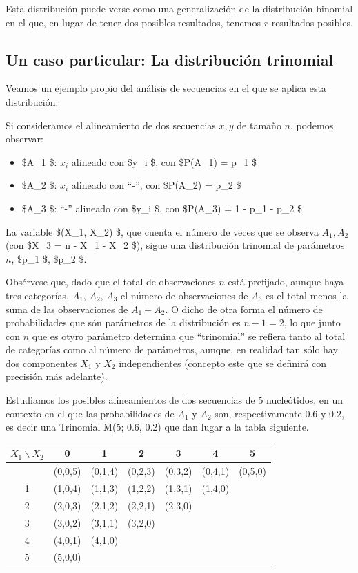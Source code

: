 \documentclass[
  a4paper,
  DIV=11,
  numbers=noendperiod]{scrreprt}
\providecommand{\tightlist}{%
  \setlength{\itemsep}{0pt}\setlength{\parskip}{0pt}}\usepackage{longtable,booktabs,array}
\begin{document}
Esta distribución puede verse como una generalización de la distribución
binomial en el que, en lugar de tener dos posibles resultados, tenemos
\(r\) resultados posibles.

\subsection{Un caso particular: La distribución
trinomial}\label{un-caso-particular-la-distribuciuxf3n-trinomial}

Veamos un ejemplo propio del análisis de secuencias en el que se aplica
esta distribución:

Si consideramos el alineamiento de dos secuencias \(x, y\) de tamaño
\(n\), podemos observar:

\begin{itemize}
\tightlist
\item
  \$A\_1 \$: \(x_i\) alineado con \$y\_i \$, con \$P(A\_1) = p\_1 \$
\item
  \$A\_2 \$: \(x_i\) alineado con ``-'', con \$P(A\_2) = p\_2 \$
\item
  \$A\_3 \$: ``-'' alineado con \$y\_i \$, con \$P(A\_3) = 1 - p\_1 -
  p\_2 \$
\end{itemize}

La variable \$(X\_1, X\_2) \$, que cuenta el número de veces que se
observa \(A_1, A_2\) (con \$X\_3 = n - X\_1 - X\_2 \$), sigue una
distribución trinomial de parámetros \(n\), \$p\_1 \$, \$p\_2 \$.

Obsérvese que, dado que el total de observaciones \(n\) está prefijado,
aunque haya tres categorías, \(A_1\), \(A_2\), \(A_3\) el número de
observaciones de \(A_3\) es el total menos la suma de las observaciones
de \(A_1+A_2\). O dicho de otra forma el número de probabilidades que
són parámetros de la distribución es \(n-1=2\), lo que junto con \(n\)
que es otyro parámetro determina que ``trinomial'' se refiera tanto al
total de categorías como al número de parámetros, aunque, en realidad
tan sólo hay dos componentes \(X_1\) y \(X_2\) independientes (concepto
este que se definirá con precisión más adelante).

Estudiamos los posibles alineamientos de dos secuencias de 5
nucleótidos, en un contexto en el que las probabilidades de \(A_1\) y
\(A_2\) son, respectivamente 0.6 y 0.2, es decir una Trinomial M(5; 0.6,
0.2) que dan lugar a la tabla siguiente.

\begin{longtable}[]{@{}ccccccc@{}}
\toprule\noalign{}
\(X_{1} \backslash X_{2}\) & 0 & 1 & 2 & 3 & 4 & 5 \\
\midrule\noalign{}
\endhead
\bottomrule\noalign{}
\endlastfoot
0 & (0,0,5) & (0,1,4) & (0,2,3) & (0,3,2) & (0,4,1) & (0,5,0) \\
1 & (1,0,4) & (1,1,3) & (1,2,2) & (1,3,1) & (1,4,0) & \\
2 & (2,0,3) & (2,1,2) & (2,2,1) & (2,3,0) & & \\
3 & (3,0,2) & (3,1,1) & (3,2,0) & & & \\
4 & (4,0,1) & (4,1,0) & & & & \\
5 & (5,0,0) & & & & & \\
\end{longtable}
\end{document}
